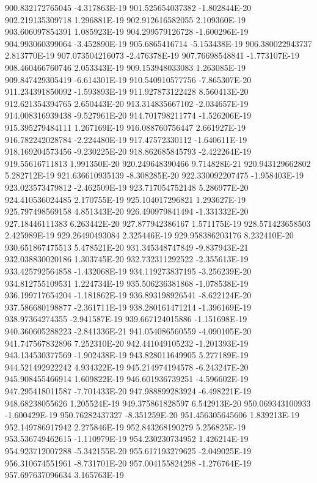 900.832172765045  -4.317863E-19
901.525654037382  -1.802844E-20
902.219135309718  1.296881E-19
902.912616582055  2.109360E-19
903.606097854391  1.085923E-19
904.299579126728  -1.600296E-19
904.993060399064  -3.452890E-19
905.6865416714  -5.153438E-19
906.380022943737  2.813770E-19
907.073504216073  -2.476378E-19
907.76698548841  -1.773107E-19
908.460466760746  2.053343E-19
909.153948033083  1.263085E-19
909.847429305419  -6.614301E-19
910.540910577756  -7.865307E-20
911.234391850092  -1.593893E-19
911.927873122428  8.560413E-20
912.621354394765  2.650443E-20
913.314835667102  -2.034657E-19
914.008316939438  -9.527961E-20
914.701798211774  -1.526206E-19
915.395279484111  1.267169E-19
916.088760756447  2.661927E-19
916.782242028784  -2.224480E-19
917.47572330112  -1.640611E-19
918.169204573456  -9.230225E-20
918.862685845793  -2.422264E-19
919.55616711813  1.991350E-20
920.249648390466  9.714828E-21
920.943129662802  5.282712E-19
921.636610935139  -8.308285E-20
922.330092207475  -1.958403E-19
923.023573479812  -2.462509E-19
923.717054752148  5.286977E-20
924.410536024485  2.170755E-19
925.104017296821  1.293627E-19
925.797498569158  4.851343E-20
926.490979841494  -1.331332E-20
927.18446111383  6.263442E-20
927.877942386167  1.571175E-19
928.571423658503  2.425989E-19
929.26490493084  2.325446E-19
929.958386203176  8.232410E-20
930.651867475513  5.478521E-20
931.345348747849  -9.837943E-21
932.038830020186  1.303745E-20
932.732311292522  -2.355613E-19
933.425792564858  -1.432068E-19
934.119273837195  -3.256239E-20
934.812755109531  1.224734E-19
935.506236381868  -1.078538E-19
936.199717654204  -1.181862E-19
936.893198926541  -8.622124E-20
937.586680198877  -2.361711E-19
938.280161471214  -1.396169E-19
938.97364274355  -2.941587E-19
939.667124015886  -1.151698E-19
940.360605288223  -2.841336E-21
941.054086560559  -4.090105E-20
941.747567832896  7.252310E-20
942.441049105232  -1.201393E-19
943.134530377569  -1.902438E-19
943.828011649905  5.277189E-19
944.521492922242  4.934322E-19
945.214974194578  -6.243247E-20
945.908455466914  1.609822E-19
946.601936739251  -4.596602E-19
947.295418011587  -7.701433E-20
947.988899283924  -6.498221E-19
948.68238055626  1.205524E-19
949.375861828597  6.542913E-20
950.069343100933  -1.600429E-19
950.76282437327  -8.351259E-20
951.456305645606  1.839213E-19
952.149786917942  2.275846E-19
952.843268190279  5.256825E-19
953.536749462615  -1.110979E-19
954.230230734952  1.426214E-19
954.923712007288  -5.342155E-20
955.617193279625  -2.049025E-19
956.310674551961  -8.731701E-20
957.004155824298  -1.276764E-19
957.697637096634  3.165763E-19

